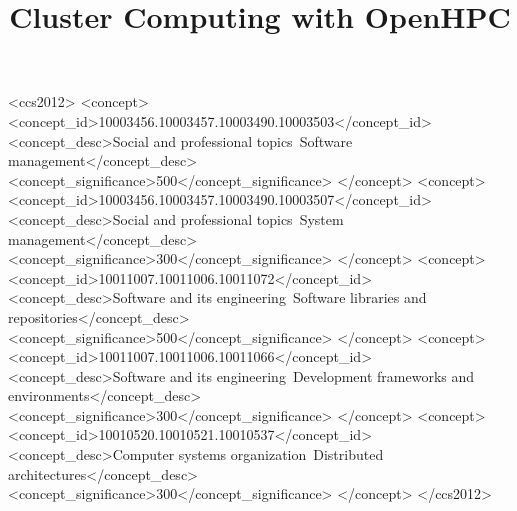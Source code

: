 \documentclass{sig-alternate-05-2015}
\begin{document}






%

\title{Cluster Computing with OpenHPC}



\maketitle



%

\begin{CCSXML}
  <ccs2012>
  <concept>
  <concept_id>10003456.10003457.10003490.10003503</concept_id>
  <concept_desc>Social and professional topics~Software
  management</concept_desc>
  <concept_significance>500</concept_significance>
  </concept>
  <concept>
  <concept_id>10003456.10003457.10003490.10003507</concept_id>
  <concept_desc>Social and professional topics~System management</concept_desc>
  <concept_significance>300</concept_significance>
  </concept>
  <concept>
  <concept_id>10011007.10011006.10011072</concept_id>
  <concept_desc>Software and its engineering~Software libraries and
  repositories</concept_desc>
  <concept_significance>500</concept_significance>
  </concept>
  <concept>
  <concept_id>10011007.10011006.10011066</concept_id>
  <concept_desc>Software and its engineering~Development frameworks and
  environments</concept_desc>
  <concept_significance>300</concept_significance>
  </concept>
  <concept>
  <concept_id>10010520.10010521.10010537</concept_id>
  <concept_desc>Computer systems organization~Distributed
  architectures</concept_desc>
  <concept_significance>300</concept_significance>
  </concept>
  </ccs2012>
\end{CCSXML}
\end{document}
